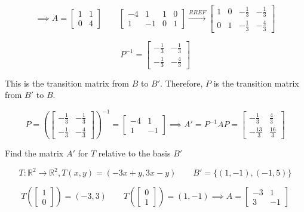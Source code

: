 \documentclass{report}
\begin{document}
$$
\implies A = \begin{bmatrix} 1 & 1 \\ 0 & 4 \end{bmatrix} \quad \quad \begin{bmatrix} -4 & 1 & 1 & 0 \\ 1 & -1 & 0 & 1 \end{bmatrix} \xrightarrow{RREF} \begin{bmatrix} 1 & 0 & -\frac{1}{3} & -\frac{1}{3} \\ 0 & 1 & -\frac{1}{3} & -\frac{4}{3} \end{bmatrix} 
$$

$$
P^{-1} = \begin{bmatrix} -\frac{1}{3} & -\frac{1}{3} \\ -\frac{1}{3} & -\frac{4}{3} \end{bmatrix}
$$

\noindent This is the transition matrix from $B$ to $B'$. Therefore, $P$ is the transition matrix from $B'$ to $B$.

$$
P = \left( \begin{bmatrix} -\frac{1}{3} & -\frac{1}{3} \\ -\frac{1}{3} & -\frac{4}{3} \end{bmatrix} \right)^{-1} = \begin{bmatrix}-4 & 1 \\ 1 & -1 \end{bmatrix} \implies A' = P^{-1} A P = \begin{bmatrix} -\frac{1}{3} & \frac{4}{3} \\ -\frac{13}{3} & \frac{16}{3} \end{bmatrix} 
$$

\begin{tcolorbox}[colframe = lightred]
	Find the matrix $A'$ for $T$ relative to the basis $B'$
	
	$$
	T: \mathbb{R}^2 \to \mathbb{R}^2, T(x,y) = (-3x+y, 3x-y) \quad \quad B' = \{ (1,-1), (-1,5)\}
	$$
\end{tcolorbox}

$$
T \left( \begin{bmatrix}1 \\ 0 \end{bmatrix} \right) = (-3,3) \quad \quad T \left( \begin{bmatrix} 0 \\ 1 \end{bmatrix} \right) = (1,-1) \implies A = \begin{bmatrix} -3 & 1 \\ 3 & -1 \end{bmatrix} 
$$
\end{document}
